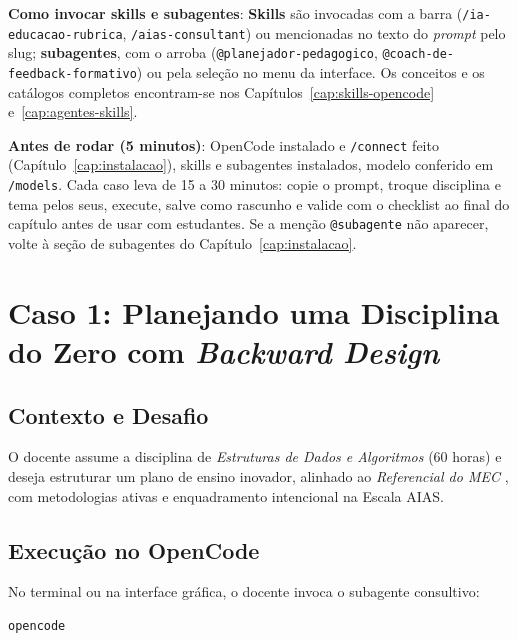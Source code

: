 \begin{atencaopedagogica}
\textbf{Como invocar skills e subagentes}: \textbf{Skills} s{\~a}o invocadas com a barra (\texttt{/ia-educacao-rubrica}, \texttt{/aias-consultant}) ou mencionadas no texto do \emph{prompt} pelo slug; \textbf{subagentes}, com o arroba (\texttt{@planejador-pedagogico}, \texttt{@coach-de-feedback-formativo}) ou pela sele{\c c}{\~a}o no menu da interface. Os conceitos e os cat{\'a}logos completos encontram-se nos Cap{\'i}tulos~\ref{cap:skills-opencode} e~\ref{cap:agentes-skills}.
\end{atencaopedagogica}

\begin{dicaopencode}
\textbf{Antes de rodar (5 minutos)}: OpenCode instalado e \texttt{/connect} feito (Cap{\'i}tulo~\ref{cap:instalacao}), skills e subagentes instalados, modelo conferido em \texttt{/models}. Cada caso leva de 15 a 30 minutos: copie o prompt, troque disciplina e tema pelos seus, execute, salve como rascunho e valide com o checklist ao final do cap{\'i}tulo antes de usar com estudantes. Se a men{\c c}{\~a}o \texttt{@subagente} n{\~a}o aparecer, volte {\`a} se{\c c}{\~a}o de subagentes do Cap{\'i}tulo~\ref{cap:instalacao}.
\end{dicaopencode}

\section{Caso 1: Planejando uma Disciplina do Zero com \emph{Backward Design}}

\subsection{Contexto e Desafio}
O docente assume a disciplina de \emph{Estruturas de Dados e Algoritmos} (60 horas) e deseja estruturar um plano de ensino inovador, alinhado ao \emph{Referencial do MEC} \cite{brasil2026referencial}, com metodologias ativas e enquadramento intencional na Escala AIAS.

\subsection{Execu{\c c}{\~a}o no OpenCode}
No terminal ou na interface gr{\'a}fica, o docente invoca o subagente consultivo:

\begin{lstlisting}[language=bash]
opencode
\end{lstlisting}

